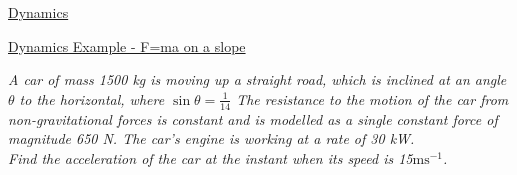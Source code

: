 \documentclass{article}[18pt]
\begin{document}
\begin{center}
\underline{\huge Dynamics}
\end{center}
\newpage
\begin{center}
\underline{\huge Dynamics Example - F=ma on a slope}
\end{center}
\textit{A car of mass 1500 kg is moving up a straight road, which is inclined at an angle $\theta$ to the
horizontal, where $\sin\theta=\frac{1}{14}$ The resistance to the motion of the car from non-gravitational
forces is constant and is modelled as a single constant force of magnitude 650 N. The car’s
engine is working at a rate of 30 kW.\\
Find the acceleration of the car at the instant when its speed is 15$\text{ms}^{-1}$.}\\
\\
\end{document}
